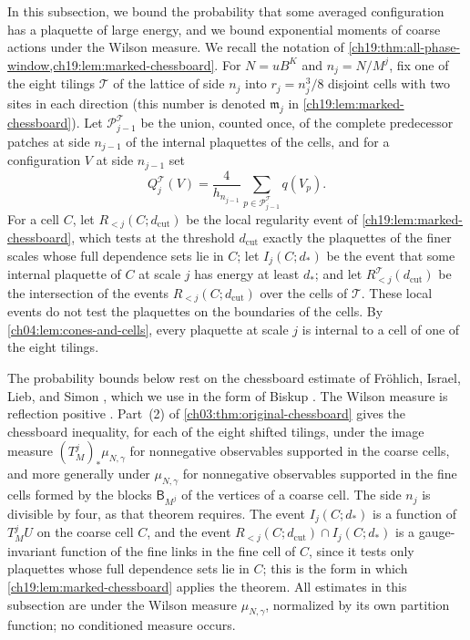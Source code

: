 In this subsection, we bound the probability that some averaged configuration has a plaquette of large energy, and we bound exponential moments of coarse actions under the Wilson measure. We recall the notation of \cref{ch19:thm:all-phase-window,ch19:lem:marked-chessboard}. For $N=uB^K$ and $n_j=N/M^j$, fix one of the eight tilings $\mathcal T$ of the lattice of side $n_j$ into $r_j=n_j^3/8$ disjoint cells with two sites in each direction (this number is denoted $\mathfrak m_j$ in \cref{ch19:lem:marked-chessboard}). Let $\mathcal P_{j-1}^{\mathcal T}$ be the union, counted once, of the complete predecessor patches at side $n_{j-1}$ of the internal plaquettes of the cells, and for a configuration $V$ at side $n_{j-1}$ set
\[
 Q_j^{\mathcal T}(V)=\frac4{h_{n_{j-1}}}\sum_{p\in\mathcal P_{j-1}^{\mathcal T}}q(V_p).
\]
For a cell $C$, let $R_{<j}(C;d_{\mathrm{cut}})$ be the local regularity event of \cref{ch19:lem:marked-chessboard}, which tests at the threshold $d_{\mathrm{cut}}$ exactly the plaquettes of the finer scales whose full dependence sets lie in $C$; let $I_j(C;d_*)$ be the event that some internal plaquette of $C$ at scale $j$ has energy at least $d_*$; and let $R^{\mathcal T}_{<j}(d_{\mathrm{cut}})$ be the intersection of the events $R_{<j}(C;d_{\mathrm{cut}})$ over the cells of $\mathcal T$. These local events do not test the plaquettes on the boundaries of the cells. By \cref{ch04:lem:cones-and-cells}, every plaquette at scale $j$ is internal to a cell of one of the eight tilings.

The probability bounds below rest on the chessboard estimate of Fr\"ohlich, Israel, Lieb, and Simon \cite{FILS1978,FILS1980}, which we use in the form of Biskup \cite[Theorem~5.8]{Biskup2009}. The Wilson measure is reflection positive \cite{OsterwalderSeiler1978}. Part~(2) of \cref{ch03:thm:original-chessboard} gives the chessboard inequality, for each of the eight shifted tilings, under the image measure $(T_M^j)_*\mu_{N,\gamma}$ for nonnegative observables supported in the coarse cells, and more generally under $\mu_{N,\gamma}$ for nonnegative observables supported in the fine cells formed by the blocks $\mathsf B_{M^j}$ of the vertices of a coarse cell. The side $n_j$ is divisible by four, as that theorem requires. The event $I_j(C;d_*)$ is a function of $T_M^jU$ on the coarse cell $C$, and the event $R_{<j}(C;d_{\mathrm{cut}})\cap I_j(C;d_*)$ is a gauge-invariant function of the fine links in the fine cell of $C$, since it tests only plaquettes whose full dependence sets lie in $C$; this is the form in which \cref{ch19:lem:marked-chessboard} applies the theorem. All estimates in this subsection are under the Wilson measure $\mu_{N,\gamma}$, normalized by its own partition function; no conditioned measure occurs.

